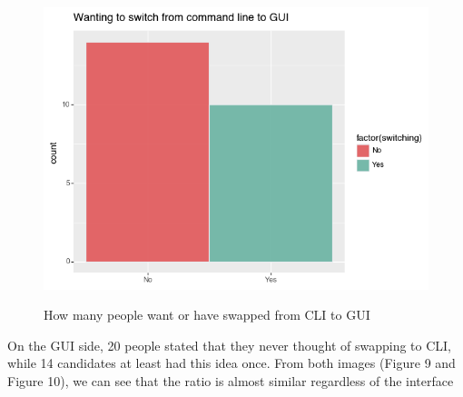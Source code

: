 \documentclass[]{report}
\begin{document}
		\begin{figure}[H]
			\centering
			\includegraphics[width=0.75\linewidth]{SwitchingCLI}\\
			\caption{How many people want or have swapped from CLI to GUI}
			\label{fig:13}
		\end{figure}
		
		On the GUI side, 20 people stated that they never thought of swapping to CLI, while 14 candidates at least had this idea once.
		From both images (Figure 9 and Figure 10), we can see that the ratio is almost similar regardless of the interface
		
\end{document}

